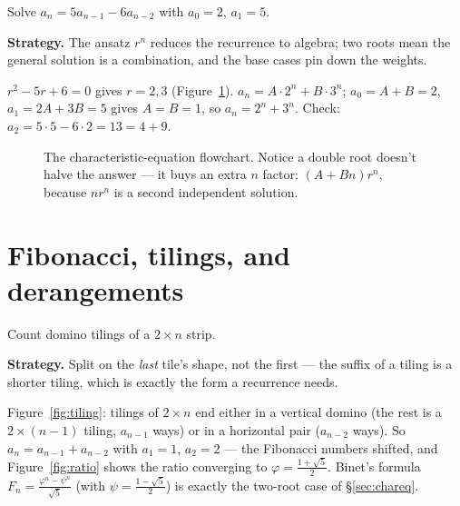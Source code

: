 \begin{example}\label{ex:chareq}
Solve $a_n = 5a_{n-1} - 6a_{n-2}$ with $a_0 = 2$, $a_1 = 5$.
\par\smallskip
\textbf{Strategy.} The ansatz $r^n$ reduces the recurrence to algebra;
two roots mean the general solution is a combination, and the base
cases pin down the weights.
\par\smallskip
\begin{solution}
$r^2 - 5r + 6 = 0$ gives $r = 2, 3$ (Figure~\ref{fig:chareq}).
$a_n = A\cdot 2^n + B \cdot 3^n$; $a_0 = A + B = 2$, $a_1 = 2A + 3B = 5$
gives $A = B = 1$, so $a_n = 2^n + 3^n$. Check: $a_2 = 5\cdot 5 - 6\cdot
2 = 13 = 4 + 9$.
\end{solution}
\end{example}

\begin{figure}[ht]\centering

\caption{The characteristic-equation flowchart. Notice a double root
doesn't halve the answer --- it buys an extra $n$ factor:
$(A + Bn)r^n$, because $n r^n$ is a second independent solution.}
\label{fig:chareq}
\end{figure}

\section{Fibonacci, tilings, and derangements}\label{sec:fib}

\begin{example}\label{ex:tiling}
Count domino tilings of a $2 \times n$ strip.
\par\smallskip
\textbf{Strategy.} Split on the \emph{last} tile's shape, not the first
--- the suffix of a tiling is a shorter tiling, which is exactly the
form a recurrence needs.
\par\smallskip
\begin{solution}
Figure~\ref{fig:tiling}: tilings of $2 \times n$ end either in a
vertical domino (the rest is a $2 \times (n-1)$ tiling, $a_{n-1}$ ways)
or in a horizontal pair ($a_{n-2}$ ways). So $a_n = a_{n-1} + a_{n-2}$
with $a_1 = 1$, $a_2 = 2$ --- the Fibonacci numbers shifted, and
Figure~\ref{fig:ratio} shows the ratio converging to
$\varphi = \frac{1+\sqrt5}{2}$. Binet's formula
$F_n = \frac{\varphi^n - \psi^n}{\sqrt5}$ (with
$\psi = \frac{1-\sqrt5}{2}$) is exactly the two-root case of
\S\ref{sec:chareq}.
\end{solution}
\end{example}

